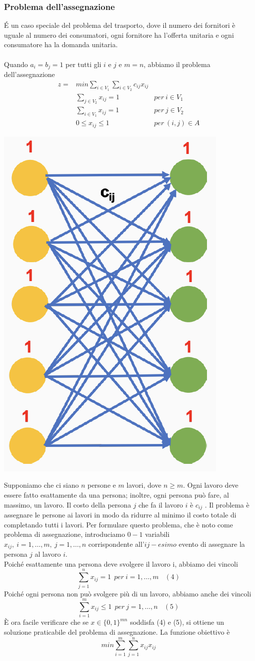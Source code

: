\documentclass[12pt,a4paper]{article}
\begin{document}
\subsubsection{Problema dell'assegnazione} 
\'E un caso speciale del problema del trasporto, dove il numero dei fornitori è uguale al numero dei consumatori, ogni fornitore ha l'offerta unitaria e ogni consumatore ha la domanda unitaria.\\\\
Quando $a_i=b_j=1$ per tutti gli $i$ e $j$ e $m=n$, abbiamo il problema dell'assegnazione
$$\begin{array}{rll}
z = & min \sum_{i\in V_1}\sum_{i \in V_2} c_{ij}x_{ij} &\\
& \sum_{j \in V_2}x_{ij} = 1 & per\ i\in V_1\\
& \sum_{i \in V_1}x_{ij} = 1 & per\ j\in V_2\\
& 0 \leq x_{ij} \leq 1 & per\ (i,j) \in A
\end{array}$$
\begin{center}
\includegraphics[width=0.4\columnwidth]{img/ap.png}
\end{center}
Supponiamo che ci siano $n$ persone e $m$ lavori, dove $n \geq m$. Ogni lavoro deve essere fatto esattamente da una persona; inoltre, ogni persona può fare, al massimo, un lavoro. Il costo della persona $j$ che fa il lavoro $i$ è $c_{ij}$ . Il problema è assegnare le persone ai lavori in modo da ridurre al minimo il costo totale di completando tutti i lavori. Per formulare questo problema, che è noto come problema di assegnazione, introduciamo $0-1$ variabili $x_{ij} ,\ i = 1, \dots , m,\  j = 1, \dots , n$ corrispondente all'$ij-esimo$ evento di assegnare la persona $j$ al lavoro $i$.\\
Poiché esattamente una persona deve svolgere il lavoro i, abbiamo dei vincoli
$$\sum_{j=1}^nx_{ij} = 1\ \  per\ i=1,\dots,m \ \ \ \ (4)$$
Poiché ogni persona non può svolgere più di un lavoro, abbiamo anche dei vincoli
$$\sum_{i=1}^m x_{ij} \leq 1 \ \ per\ j=1,\dots,n \ \ \ \ (5)$$
È ora facile verificare che se $x \in \{0, 1\}^{mn}$ soddisfa (4) e (5), si ottiene un soluzione praticabile del problema di assegnazione. La funzione obiettivo è
$$min\sum_{i=1}^m\sum_{j=1}^n x_{ij}x_{ij}$$
\end{document}
